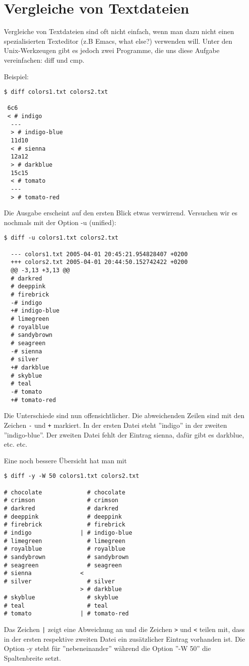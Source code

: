 \section{Vergleiche von Textdateien}
Vergleiche von Textdateien sind oft nicht einfach, wenn man dazu
nicht einen spezialisierten Texteditor (z.B Emacs, what else?) verwenden will.
Unter den Unix-Werkzeugen gibt es jedoch zwei Programme, die
uns diese Aufgabe vereinfachen: diff und cmp.

\newslide
Beispiel:
\begin{lstlisting}[basicstyle=\small]
$ diff colors1.txt colors2.txt

 6c6
 < # indigo
  ---
  > # indigo-blue
  11d10
  < # sienna
  12a12
  > # darkblue
  15c15
  < # tomato
  ---
  > # tomato-red
\end{lstlisting}
\newslide
Die Ausgabe erscheint auf den ersten Blick etwas verwirrend.
Versuchen wir es nochmals mit der Option -u (unified):
\begin{lstlisting}
$ diff -u colors1.txt colors2.txt

  --- colors1.txt 2005-04-01 20:45:21.954828407 +0200
  +++ colors2.txt 2005-04-01 20:44:50.152742422 +0200
  @@ -3,13 +3,13 @@
  # darkred
  # deeppink
  # firebrick
  -# indigo
  +# indigo-blue
  # limegreen
  # royalblue
  # sandybrown
  # seagreen
  -# sienna
  # silver
  +# darkblue
  # skyblue
  # teal
  -# tomato
  +# tomato-red
\end{lstlisting}
Die Unterschiede sind nun offensichtlicher. Die abweichenden
Zeilen sind mit den Zeichen \verb+-+ und \verb|+| markiert.
In der ersten Datei steht ''indigo''
in der zweiten ''indigo-blue''. Der zweiten Datei fehlt der Eintrag
sienna, dafür gibt es darkblue, etc. etc.

\newslide
Eine noch bessere Übersicht hat man mit
\begin{lstlisting}
$ diff -y -W 50 colors1.txt colors2.txt

# chocolate             # chocolate
# crimson               # crimson
# darkred               # darkred
# deeppink              # deeppink
# firebrick             # firebrick
# indigo              | # indigo-blue
# limegreen             # limegreen
# royalblue             # royalblue
# sandybrown            # sandybrown
# seagreen              # seagreen
# sienna              <
# silver                # silver
                      > # darkblue
# skyblue               # skyblue
# teal                  # teal
# tomato              | # tomato-red
\end{lstlisting}
Das Zeichen \verb+|+ zeigt eine Abweichung an und die Zeichen
\verb+>+ und  \verb+<+ teilen mit, dass in der ersten
respektive zweiten Datei ein zusätzlicher
Eintrag vorhanden ist.
Die Option -y
steht für ''nebeneinander'' während die Option ''-W 50''
die Spaltenbreite setzt.

